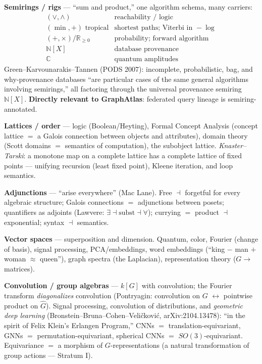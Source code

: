 \documentclass[11pt]{article}
\theoremstyle{plain}
\theoremstyle{definition}
\theoremstyle{remark}
\begin{document}
\textbf{Semirings / rigs} --- ``sum and product,'' one algorithm schema, many carriers:
\[
\begin{array}{ll}
(\vee,\wedge) & \text{reachability / logic} \\
(\min,+) \text{ tropical} & \text{shortest paths; Viterbi in }-\log \\
(+,\times)/\mathbb{R}_{\ge0} & \text{probability; forward algorithm} \\
\mathbb{N}[X] & \text{database provenance} \\
\mathbb{C} & \text{quantum amplitudes}
\end{array}
\]
Green--Karvounarakis--Tannen (PODS 2007): incomplete, probabilistic, bag, and why-provenance databases ``are particular cases of the same general algorithms involving semirings,'' all factoring through the universal provenance semiring $\mathbb{N}[X]$. \textbf{Directly relevant to GraphAtlas}: federated query lineage is semiring-annotated.

\textbf{Lattices / order} --- logic (Boolean/Heyting), Formal Concept Analysis (concept lattice $=$ a Galois connection between objects and attributes), domain theory (Scott domains $=$ semantics of computation), the subobject lattice. \emph{Knaster--Tarski}: a monotone map on a complete lattice has a complete lattice of fixed points --- unifying recursion (least fixed point), Kleene iteration, and loop semantics.

\textbf{Adjunctions} --- ``arise everywhere'' (Mac Lane). Free $\dashv$ forgetful for every algebraic structure; Galois connections $=$ adjunctions between posets; quantifiers as adjoints (Lawvere: $\exists \dashv \text{subst} \dashv \forall$); currying $=$ product $\dashv$ exponential; syntax $\dashv$ semantics.

\textbf{Vector spaces} --- superposition and dimension. Quantum, color, Fourier (change of basis), signal processing, PCA/embeddings, word embeddings (``king $-$ man $+$ woman $\approx$ queen''), graph spectra (the Laplacian), representation theory ($G\to$ matrices).

\textbf{Convolution / group algebras} --- $k[G]$ with convolution; the Fourier transform \emph{diagonalizes} convolution (Pontryagin: convolution on $G$ $\leftrightarrow$ pointwise product on $\hat G$). Signal processing, convolution of distributions, and \emph{geometric deep learning} (Bronstein--Bruna--Cohen--Veli\v{c}kovi\'c, arXiv:2104.13478): ``in the spirit of Felix Klein's Erlangen Program,'' CNNs $=$ translation-equivariant, GNNs $=$ permutation-equivariant, spherical CNNs $=$ $SO(3)$-equivariant. Equivariance $=$ a morphism of $G$-representations (a natural transformation of group actions --- Stratum I).
\end{document}
